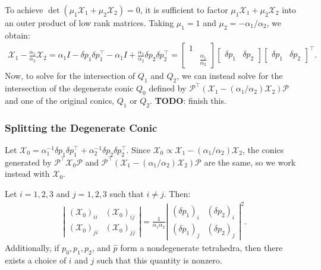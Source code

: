 \documentclass{article}
\begin{document}
To achieve $\det(\mu_1 \mathcal{X}_1 + \mu_2 \mathcal{X}_2) = 0$, it is sufficient to
factor $\mu_1 \mathcal{X}_1 + \mu_2 \mathcal{X}_2$ into an outer product of low rank
matrices. Taking $\mu_1 = 1$ and $\mu_2 = -\alpha_1/\alpha_2$, we
obtain:
\begin{align*}
  \mathcal{X}_1 - \frac{\alpha_1}{\alpha_2} \mathcal{X}_2 = \alpha_1 I - \delta p_1 \delta p_1^\top - \alpha_1 I + \frac{\alpha_1}{\alpha_2} \delta p_2 \delta p_2^\top = \begin{bmatrix} 1 & \\ & \frac{\alpha_1}{\alpha_2} \end{bmatrix} \begin{bmatrix} \delta p_1 & \delta p_2 \end{bmatrix} \begin{bmatrix} \delta p_1 & \delta p_2 \end{bmatrix}^\top.
\end{align*}
Now, to solve for the intersection of $Q_1$ and $Q_2$, we can instead
solve for the intersection of the degenerate conic $Q_0$ defined by
$\mathcal{P}^\top {(\mathcal{X}_1 - (\alpha_1/\alpha_2) \mathcal{X}_2)} \mathcal{P}$ and
one of the original conics, $Q_1$ or $Q_2$. \textbf{TODO}: finish
this.

\subsubsection*{Splitting the Degenerate Conic}

Let
$\mathcal{X}_0 = \alpha_1^{-1} \delta p_1 \delta p_1^\top +
\alpha_2^{-1} \delta p_2 \delta p_2^\top$. Since
$\mathcal{X}_0 \propto \mathcal{X}_1 - (\alpha_1/\alpha_2)
\mathcal{X}_2$, the conics generated by
$\mathcal{P}^\top \mathcal{X}_0 \mathcal{P}$ and
$\mathcal{P}^\top {(\mathcal{X}_1 - (\alpha_1/\alpha_2)
  \mathcal{X}_2)} \mathcal{P}$ are the same, so we work instead with
$\mathcal{X}_0$.

\begin{lemma}
  Let $i = 1, 2, 3$ and $j = 1, 2, 3$ such that $i \neq j$. Then:
  \begin{align*}
    \left|\begin{matrix}
      {(\mathcal{X}_0)}_{ii} & {(\mathcal{X}_0)}_{ij} \\
      {(\mathcal{X}_0)}_{ji} & {(\mathcal{X}_0)}_{jj}
    \end{matrix}\right| = \frac{1}{\alpha_1 \alpha_2} \left|\begin{matrix}
      {(\delta p_1)}_i & {(\delta p_2)}_i \\
      {(\delta p_1)}_j & {(\delta p_2)}_j
    \end{matrix}\right|^2.
  \end{align*}
  Additionally, if $p_0, p_1, p_2$, and $\hat{p}$ form a nondegenerate
  tetrahedra, then there exists a choice of $i$ and $j$ such that this
  quantity is nonzero.
\end{lemma}
\end{document}

